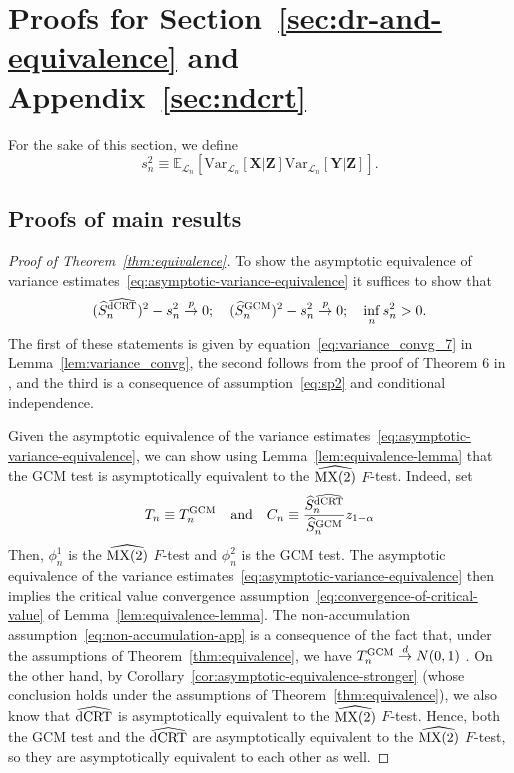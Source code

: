 \documentclass[12pt]{article}
\makeatletter
\theoremstyle{definition}
\theoremstyle{remark}
\newcommand\newtarget[2]{\Hy@raisedlink{\hypertarget{#1}{}}#2}
\newcommand{\E}{\mathbb E}								%
\newcommand{\V}{\mathrm{Var}}							%
\newcommand{\convp}{\overset p \rightarrow}             %
\newcommand{\convd}{\overset d \rightarrow}             %
\newcommand{\prx}{\bm X}								%
\newcommand{\prz}{\bm Z}								%
\newcommand{\pry}{{\bm Y}}								%
\newcommand{\law}{\mathcal L}							%
\newcommand{\GCM}{\textnormal{GCM}}						%
\newcommand{\dCRThat}{\widehat{\textnormal{dCRT}}}		%
\newcommand{\MXtwohat}{\widehat{\textnormal{MX(2)}}}		%
\makeatother
\begin{document}
\section{Proofs for Section~\ref{sec:dr-and-equivalence} and Appendix~\ref{sec:ndcrt}}

For the sake of this section, we define
\begin{equation}
	s^2_n \equiv \E_{\law_n}[\V_{\law_n}[\prx|\prz]\V_{\law_n}[\pry|\prz]]. 
\end{equation}

\subsection{Proofs of main results}

\begin{proof}[Proof of Theorem~\ref{thm:equivalence}]\newtarget{proof:thm:equivalence}{}

To show the asymptotic equivalence of variance estimates~\eqref{eq:asymptotic-variance-equivalence} it suffices to show that
\begin{equation}
(\widehat S_n^{\dCRThat})^2 - s^2_n \convp 0; \quad (\widehat S_n^{\GCM})^2 - s^2_n \convp 0; \quad \inf_{n} s^2_n > 0.
\end{equation}
The first of these statements is given by equation~\eqref{eq:variance_convg_7} in Lemma~\ref{lem:variance_convg}, the second follows from the proof of Theorem 6 in \citet{Shah2018}, and the third is a consequence of assumption~\eqref{eq:sp2} and conditional independence.
  
Given the asymptotic equivalence of the variance estimates~\eqref{eq:asymptotic-variance-equivalence}, we can show using Lemma~\ref{lem:equivalence-lemma} that the GCM test is asymptotically equivalent to the $\MXtwohat$ $F$-test. Indeed, set
\begin{equation}
	T_n \equiv T_n^\GCM \quad \text{and} \quad C_n \equiv \frac{\widehat S_n^{\dCRThat}}{\widehat S_{n}^{\GCM}}z_{1-\alpha}
\end{equation}
Then, $\phi_n^1$ is the $\MXtwohat$ $F$-test and $\phi_n^2$ is the GCM test. The asymptotic equivalence of the variance estimates~\eqref{eq:asymptotic-variance-equivalence} then implies the critical value convergence assumption~\eqref{eq:convergence-of-critical-value} of Lemma~\ref{lem:equivalence-lemma}. The non-accumulation assumption~\eqref{eq:non-accumulation-app} is a consequence of the fact that, under the assumptions of Theorem~\ref{thm:equivalence}, we have $T^{\text{\GCM}}_n \convd N(0,1)$ \citep{Shah2018}. On the other hand, by Corollary~\ref{cor:asymptotic-equivalence-stronger} (whose conclusion holds under the assumptions of Theorem~\ref{thm:equivalence}), we also know that $\dCRThat$ is asymptotically equivalent to the $\MXtwohat$ $F$-test. Hence, both the GCM test and the $\dCRThat$ are asymptotically equivalent to the $\MXtwohat$ $F$-test, so they are asymptotically equivalent to each other as well.
\end{proof}
\end{document}
